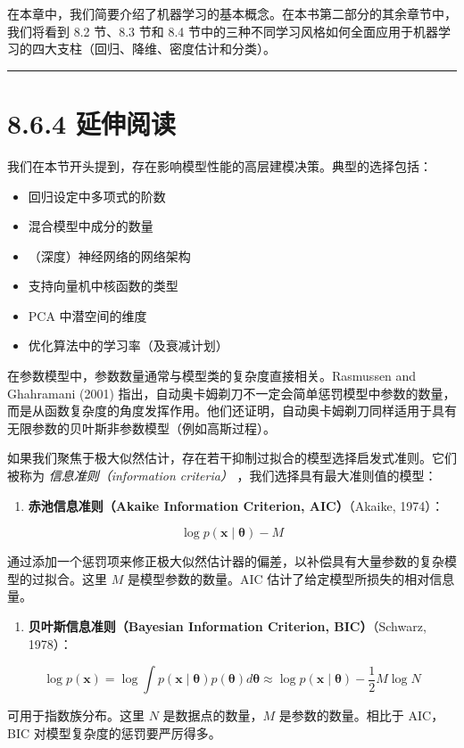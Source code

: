 在本章中，我们简要介绍了机器学习的基本概念。在本书第二部分的其余章节中，我们将看到 8.2 节、8.3 节和 8.4 节中的三种不同学习风格如何全面应用于机器学习的四大支柱（回归、降维、密度估计和分类）。

\medskip\hrule\medskip

\section*{8.6.4 延伸阅读}

我们在本节开头提到，存在影响模型性能的高层建模决策。典型的选择包括：

\begin{itemize}
\item 回归设定中多项式的阶数
\item 混合模型中成分的数量
\item （深度）神经网络的网络架构
\item 支持向量机中核函数的类型
\item PCA 中潜空间的维度
\item 优化算法中的学习率（及衰减计划）
\end{itemize}

在参数模型中，参数数量通常与模型类的复杂度直接相关。Rasmussen and Ghahramani (2001) 指出，自动奥卡姆剃刀不一定会简单惩罚模型中参数的数量，而是从函数复杂度的角度发挥作用。他们还证明，自动奥卡姆剃刀同样适用于具有无限参数的贝叶斯非参数模型（例如高斯过程）。

如果我们聚焦于极大似然估计，存在若干抑制过拟合的模型选择启发式准则。它们被称为 \emph{信息准则（information criteria）} ，我们选择具有最大准则值的模型：

\begin{enumerate}
\item \textbf{赤池信息准则（Akaike Information Criterion, AIC）}（Akaike, 1974）：
\end{enumerate}

\begin{equation}
\log p(\boldsymbol{x} \mid \boldsymbol{\theta}) - M
\tag{8.48}\label{eq:8-48}
\end{equation}

通过添加一个惩罚项来修正极大似然估计器的偏差，以补偿具有大量参数的复杂模型的过拟合。这里 $ M $ 是模型参数的数量。AIC 估计了给定模型所损失的相对信息量。

\begin{enumerate}
\item \textbf{贝叶斯信息准则（Bayesian Information Criterion, BIC）}（Schwarz, 1978）：
\end{enumerate}

\begin{equation}
\log p(\boldsymbol{x}) = \log \int p(\boldsymbol{x} \mid \boldsymbol{\theta}) p(\boldsymbol{\theta}) d\boldsymbol{\theta} \approx \log p(\boldsymbol{x} \mid \boldsymbol{\theta}) - \frac{1}{2} M \log N
\tag{8.49}\label{eq:8-49}
\end{equation}

可用于指数族分布。这里 $ N $ 是数据点的数量，$ M $ 是参数的数量。相比于 AIC，BIC 对模型复杂度的惩罚要严厉得多。
